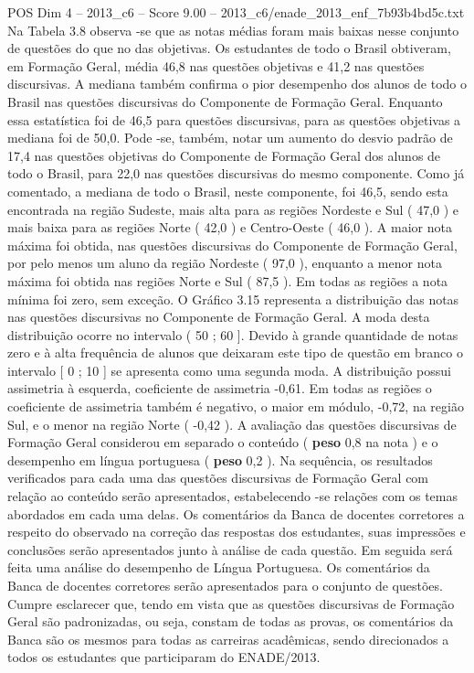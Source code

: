 \begin{textsample}{POS Dim 4 – 2013\_c6 – Score 9.00 – 2013\_c6/enade\_2013\_enf\_7b93b4bd5c.txt}
Na Tabela 3.8 observa -se que as notas médias foram mais baixas nesse conjunto de questões do que no das objetivas.
Os estudantes de todo o Brasil obtiveram, em Formação Geral, média 46,8 nas questões objetivas e 41,2 nas questões discursivas.
A mediana também confirma o pior desempenho dos alunos de todo o Brasil nas questões discursivas do Componente de Formação Geral.
Enquanto essa estatística foi de 46,5 para questões discursivas, para as questões objetivas a mediana foi de 50,0.
Pode -se, também, notar um aumento do desvio padrão de 17,4 nas questões objetivas do Componente de Formação Geral dos alunos de todo o Brasil, para 22,0 nas questões discursivas do mesmo componente.
Como já comentado, a mediana de todo o Brasil, neste componente, foi 46,5, sendo esta encontrada na região Sudeste, mais alta para as regiões Nordeste e Sul ( 47,0 ) e mais baixa para as regiões Norte ( 42,0 ) e Centro-Oeste ( 46,0 ).
A maior nota máxima foi obtida, nas questões discursivas do Componente de Formação Geral, por pelo menos um aluno da região Nordeste ( 97,0 ), enquanto a menor nota máxima foi obtida nas regiões Norte e Sul ( 87,5 ).
Em todas as regiões a nota mínima foi zero, sem exceção.
O Gráfico 3.15 representa a distribuição das notas nas questões discursivas no Componente de Formação Geral.
A moda desta distribuição ocorre no intervalo ( 50 ; 60 ].
Devido à grande quantidade de notas zero e à alta frequência de alunos que deixaram este tipo de questão em branco o intervalo [ 0 ; 10 ] se apresenta como uma segunda moda.
A distribuição possui assimetria à esquerda, coeficiente de assimetria -0,61.
Em todas as regiões o coeficiente de assimetria também é negativo, o maior em módulo, -0,72, na região Sul, e o menor na região Norte ( -0,42 ).
A avaliação das questões discursivas de Formação Geral considerou em separado o conteúdo ( \textbf{peso} 0,8 na nota ) e o desempenho em língua portuguesa ( \textbf{peso} 0,2 ).
Na sequência, os resultados verificados para cada uma das questões discursivas de Formação Geral com relação ao conteúdo serão apresentados, estabelecendo -se relações com os temas abordados em cada uma delas.
Os comentários da Banca de docentes corretores a respeito do observado na correção das respostas dos estudantes, suas impressões e conclusões serão apresentados junto à análise de cada questão.
Em seguida será feita uma análise do desempenho de Língua Portuguesa.
Os comentários da Banca de docentes corretores serão apresentados para o conjunto de questões.
Cumpre esclarecer que, tendo em vista que as questões discursivas de Formação Geral são padronizadas, ou seja, constam de todas as provas, os comentários da Banca são os mesmos para todas as carreiras acadêmicas, sendo direcionados a todos os estudantes que participaram do ENADE/2013.

\end{textsample}
